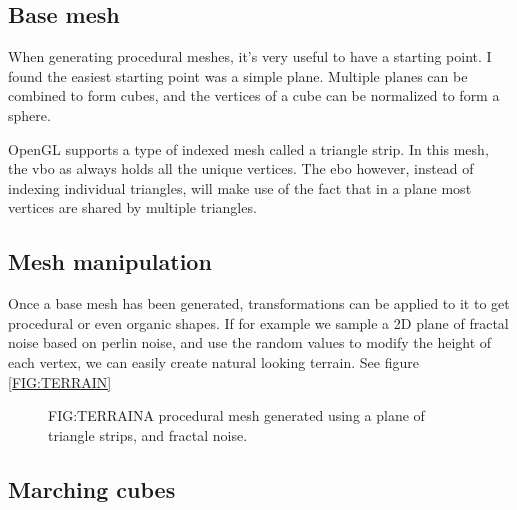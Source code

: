 
\label{SEC:PROCEDURAL}

\subsection{Base mesh}

When generating procedural meshes,
it's very useful to have a starting point.
I found the easiest starting point was a simple plane.
Multiple planes can be combined to form cubes,
and the vertices of a cube can be normalized to form a sphere.

OpenGL supports a type of indexed mesh called a triangle strip.
In this mesh,
the \ac{vbo} as always holds all the unique vertices.
The \ac{ebo} however,
instead of indexing individual triangles,
will make use of the fact that in a plane most vertices are shared by multiple triangles.

\subsection{Mesh manipulation}

Once a base mesh has been generated,
transformations can be applied to it to get procedural or even organic shapes.
If for example we sample a 2D plane of fractal noise based on perlin noise,
and use the random values to modify the height of each vertex,
we can easily create natural looking terrain.
See figure \ref{FIG:TERRAIN}

\begin{figure}[Procedural terrain mesh]{FIG:TERRAIN}{A procedural mesh generated using a plane of triangle strips, and fractal noise.}
\end{figure}


\subsection{Marching cubes}
